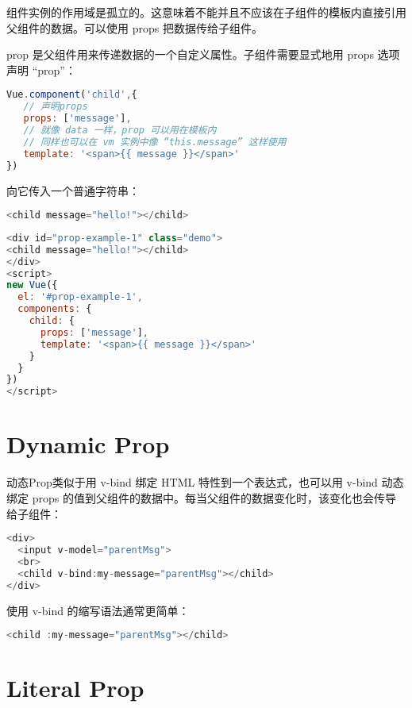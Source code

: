 组件实例的作用域是孤立的。这意味着不能并且不应该在子组件的模板内直接引用父组件的数据。可以使用 props 把数据传给子组件。


prop 是父组件用来传递数据的一个自定义属性。子组件需要显式地用 props 选项声明 “prop”：

\begin{lstlisting}[language=JavaScript]
Vue.component('child',{
   // 声明props
   props: ['message'],
   // 就像 data 一样，prop 可以用在模板内
   // 同样也可以在 vm 实例中像 “this.message” 这样使用
   template: '<span>{{ message }}</span>'
})
\end{lstlisting}

向它传入一个普通字符串：

\begin{lstlisting}[language=JavaScript]
<child message="hello!"></child>
\end{lstlisting}



\begin{lstlisting}[language=JavaScript]
<div id="prop-example-1" class="demo">
<child message="hello!"></child>
</div>
<script>
new Vue({
  el: '#prop-example-1',
  components: {
    child: {
      props: ['message'],
      template: '<span>{{ message }}</span>'
    }
  }
})
</script>
\end{lstlisting}


\section{Dynamic Prop}



动态Prop类似于用 v-bind 绑定 HTML 特性到一个表达式，也可以用 v-bind 动态绑定 props 的值到父组件的数据中。每当父组件的数据变化时，该变化也会传导给子组件：

\begin{lstlisting}[language=JavaScript]
<div>
  <input v-model="parentMsg">
  <br>
  <child v-bind:my-message="parentMsg"></child>
</div>
\end{lstlisting}

使用 v-bind 的缩写语法通常更简单：

\begin{lstlisting}[language=JavaScript]
<child :my-message="parentMsg"></child>
\end{lstlisting}


\section{Literal Prop}


